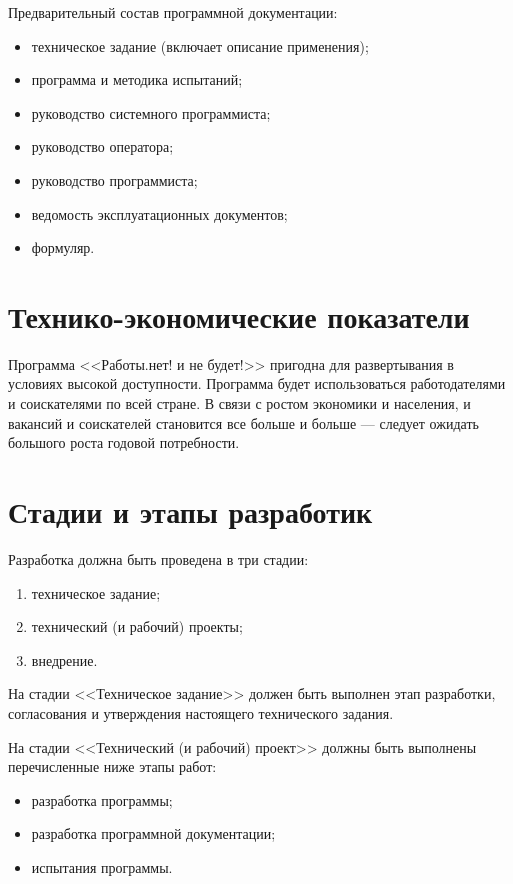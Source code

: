 \documentclass[a4page]{article}
\begin{document}
Предварительный состав программной документации:

\begin{itemize}
  \item техническое задание (включает описание применения);
  \item программа и методика испытаний;
  \item руководство системного программиста;
  \item руководство оператора;
  \item руководство программиста;
  \item ведомость эксплуатационных документов;
  \item формуляр.
\end{itemize}

\section{Технико-экономические показатели}

Программа <<Работы.нет! и не будет!>> пригодна для развертывания в условиях высокой доступности. Программа будет использоваться работодателями и соискателями по всей стране. В связи с ростом экономики и населения, и вакансий и соискателей становится все больше и больше --- следует ожидать большого роста годовой потребности.

\section{Стадии и этапы разработик}

Разработка должна быть проведена в три стадии:

\begin{enumerate}
  \item техническое задание;
  \item технический (и рабочий) проекты;
  \item внедрение.
\end{enumerate}

На стадии <<Техническое задание>> должен быть выполнен этап разработки, согласования и утверждения настоящего технического задания.

На стадии <<Технический (и рабочий) проект>> должны быть выполнены перечисленные ниже этапы работ:

\begin{itemize}
  \item разработка программы;
  \item разработка программной документации;
  \item испытания программы.
\end{itemize}
\end{document}
